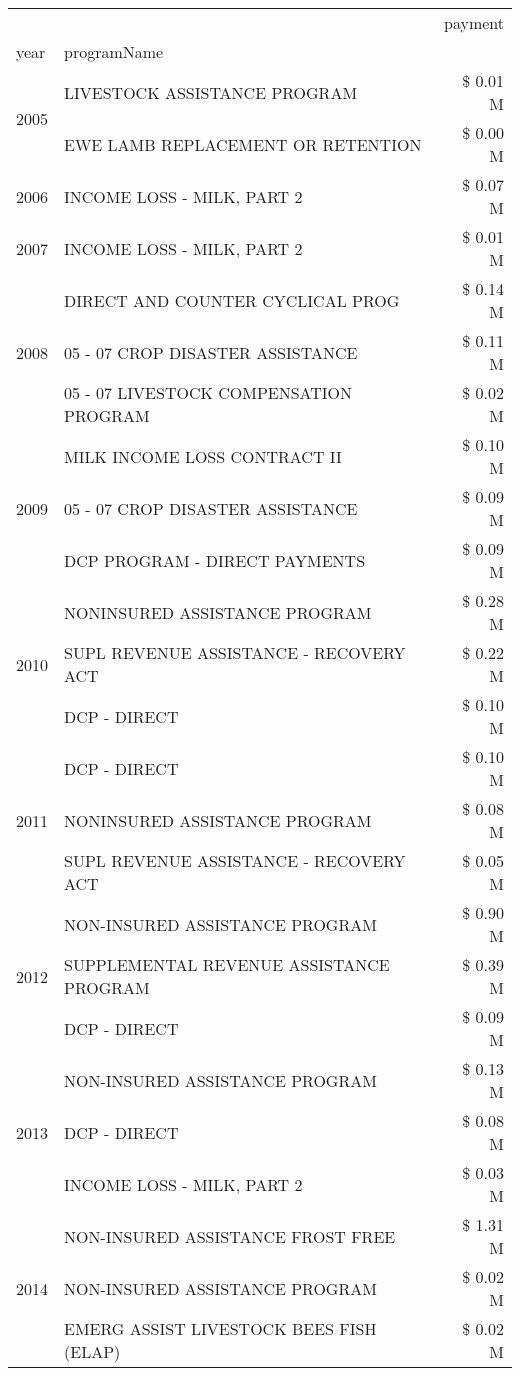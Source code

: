 \begin{tabular}{llr}
\toprule
 &  & payment \\
year & programName &  \\
\midrule
\multirow[t]{2}{*}{2005} & LIVESTOCK ASSISTANCE PROGRAM & \$ 0.01 M \\
 & EWE LAMB REPLACEMENT OR RETENTION & \$ 0.00 M \\
\cline{1-3}
2006 & INCOME LOSS - MILK, PART 2 & \$ 0.07 M \\
\cline{1-3}
2007 & INCOME LOSS - MILK, PART 2 & \$ 0.01 M \\
\cline{1-3}
\multirow[t]{3}{*}{2008} & DIRECT AND COUNTER CYCLICAL PROG & \$ 0.14 M \\
 & 05 - 07 CROP DISASTER ASSISTANCE & \$ 0.11 M \\
 & 05 - 07 LIVESTOCK COMPENSATION PROGRAM & \$ 0.02 M \\
\cline{1-3}
\multirow[t]{3}{*}{2009} & MILK INCOME LOSS CONTRACT II & \$ 0.10 M \\
 & 05 - 07 CROP DISASTER ASSISTANCE & \$ 0.09 M \\
 & DCP PROGRAM - DIRECT PAYMENTS & \$ 0.09 M \\
\cline{1-3}
\multirow[t]{3}{*}{2010} & NONINSURED ASSISTANCE PROGRAM & \$ 0.28 M \\
 & SUPL REVENUE ASSISTANCE - RECOVERY ACT & \$ 0.22 M \\
 & DCP - DIRECT & \$ 0.10 M \\
\cline{1-3}
\multirow[t]{3}{*}{2011} & DCP - DIRECT & \$ 0.10 M \\
 & NONINSURED ASSISTANCE PROGRAM & \$ 0.08 M \\
 & SUPL REVENUE ASSISTANCE - RECOVERY ACT & \$ 0.05 M \\
\cline{1-3}
\multirow[t]{3}{*}{2012} & NON-INSURED ASSISTANCE PROGRAM & \$ 0.90 M \\
 & SUPPLEMENTAL REVENUE ASSISTANCE PROGRAM & \$ 0.39 M \\
 & DCP - DIRECT & \$ 0.09 M \\
\cline{1-3}
\multirow[t]{3}{*}{2013} & NON-INSURED ASSISTANCE PROGRAM & \$ 0.13 M \\
 & DCP - DIRECT & \$ 0.08 M \\
 & INCOME LOSS - MILK, PART 2 & \$ 0.03 M \\
\cline{1-3}
\multirow[t]{3}{*}{2014} & NON-INSURED ASSISTANCE FROST FREE & \$ 1.31 M \\
 & NON-INSURED ASSISTANCE PROGRAM & \$ 0.02 M \\
 & EMERG ASSIST LIVESTOCK BEES FISH (ELAP) & \$ 0.02 M \\

\end{tabular}
